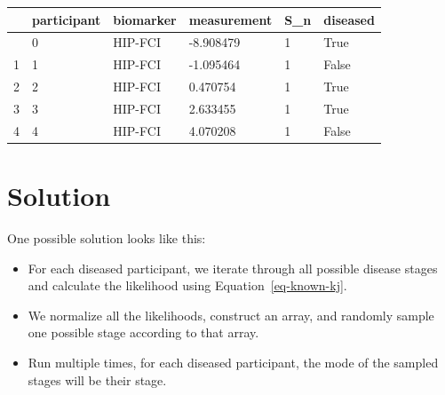 \documentclass[
  letterpaper,
  DIV=11,
  numbers=noendperiod]{scrreprt}
\begin{document}
\begin{longtable}[]{@{}llllll@{}}
\toprule\noalign{}
& participant & biomarker & measurement & S\_n & diseased \\
\midrule\noalign{}
\endhead
\bottomrule\noalign{}
\endlastfoot
0 & 0 & HIP-FCI & -8.908479 & 1 & True \\
1 & 1 & HIP-FCI & -1.095464 & 1 & False \\
2 & 2 & HIP-FCI & 0.470754 & 1 & True \\
3 & 3 & HIP-FCI & 2.633455 & 1 & True \\
4 & 4 & HIP-FCI & 4.070208 & 1 & False \\
\end{longtable}

\section{Solution}\label{solution}

One possible solution looks like this:

\begin{itemize}
\item
  For each diseased participant, we iterate through all possible disease
  stages and calculate the likelihood using Equation~\ref{eq-known-kj}.
\item
  We normalize all the likelihoods, construct an array, and randomly
  sample one possible stage according to that array.
\item
  Run multiple times, for each diseased participant, the mode of the
  sampled stages will be their stage.
\end{itemize}
\end{document}
